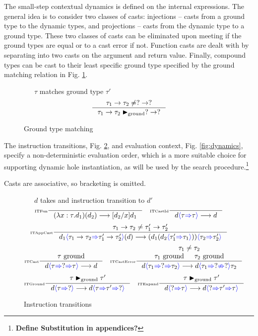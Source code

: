 The small-step contextual dynamics \cite{PracticalFoundations} is defined on the internal expressions. The general idea is to consider two classes of casts: injections -- casts from a ground type to the dynamic types, and projections -- casts from the dynamic type to a ground type. These two classes of casts can be eliminated upon meeting if the ground types are equal or to a cast error if not. Function casts are dealt with by separating into two casts on the argument and return value. Finally, compound types can be cast to their least specific ground type specified by the ground matching relation in Fig. \ref{fig:groundmatch}.

\begin{figure}
\small
{}\ \ \ $\tau$ matches ground type $\tau'$
\tiny
\[\inference[\tiny]{\tau_1 \to \tau_2 \neq ? \to ?}{\tau_1 \to \tau_2 \groundmatch ? \to ?}\]
\caption{Ground type matching}
\label{fig:groundmatch}
\end{figure}

The instruction transitions, Fig. \ref{fig:instructions}, and evaluation context, Fig. \ref{fig:dynamics}, specify a non-deterministic evaluation order, which is a more suitable choice for supporting dynamic hole instantiation, as will be used by the search procedure.\footnote{\textbf{Define Substitution in appendices?}}\par 
Casts are associative, so bracketing is omitted.
\begin{figure}
\small
{}\ \ \ $d$ takes and instruction transition to $d'$
\tiny
\[\inference[\tiny ITFun]{}{(\lambda x:\tau. d_1)(d_2) \longrightarrow [d_2/x]d_1}\quad
\inference[\tiny ITCastId]{}{d\scast{\tau}{\tau} \longrightarrow d}\]
\[\inference[\tiny ITAppCast]{\tau_1 \to \tau_2 \neq \tau_1' \to \tau_2'}{d_1\scast{\tau_1 \to \tau_2}{\tau_1' \to \tau_2'}(d) \longrightarrow (d_1(d_2\scast{\tau_1'}{\tau_1}))\scast{\tau_2}{\tau_2'}}\]
\[\inference[\tiny ITCast]{\ground}{d\scastcast{\tau}{?}{\tau} \longrightarrow d} \quad
\inference[\tiny ITCastError]{\tau_1 \neq \tau_2 \\ \ground[\tau_1] & \ground[\tau_2]}{d\scastcast{\tau_1}{?}{\tau_2}\longrightarrow d\scasterror{\tau_1}{?}{\tau_2}}\]
\[\inference[\tiny ITGround]{\tau \groundmatch \tau'}{d\scast{\tau}{?} \longrightarrow d\scastcast{\tau}{\tau'}{?}}\quad
\inference[\tiny ITExpand]{\tau \groundmatch \tau'}{d\scast{?}{\tau} \longrightarrow d\scastcast{?}{\tau'}{\tau}}\]
\caption{Instruction transitions}
\label{fig:instructions}
\end{figure}

